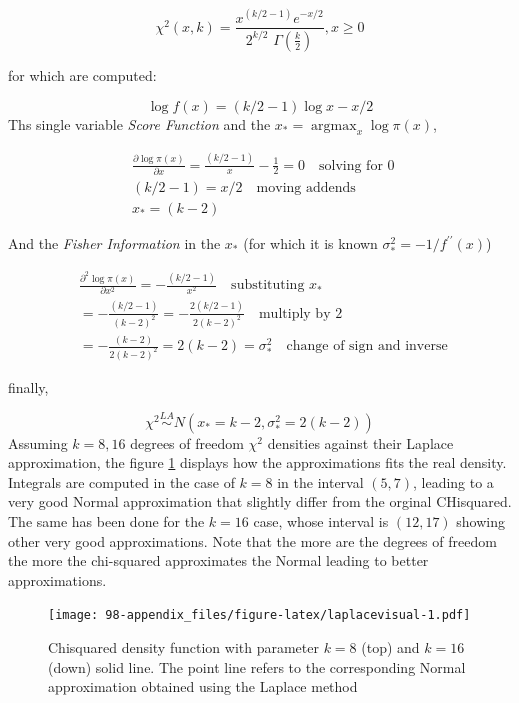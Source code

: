 \documentclass[
  12pt,
  a4paper,
  oneside]{book}
\theoremstyle{definition}
\theoremstyle{definition}
\theoremstyle{definition}
\theoremstyle{remark}
\begin{document}
\[
\chi^{2}(x,k)=\frac{x^{(k / 2-1)} e^{-x / 2}}{2^{k / 2} \,\, \Gamma\left(\frac{k}{2}\right)}, x \geq 0
\]

for which are computed:

\[
\log f(x)=(k / 2-1) \log x-x / 2
\]
Ths single variable \emph{Score Function} and the \(x_{*}=\operatorname{argmax}_{x} \log \pi(x)\),

\begin{equation}
\begin{aligned} 
  &\frac{\partial \log \pi(x)}{\partial x}= \frac{(k/2 -1)}{x} - \frac{1}{2} =0 \quad \text {solving for 0 }\\
  &(k/2-1) = x/2\quad \text {moving addends}\\
  &x_* = (k-2) 
\end{aligned}
\end{equation}

And the \emph{Fisher Information} in the \(x_*\) (for which it is known \(\sigma^{2}_*=-1 / f^{\prime \prime}(x)\))

\begin{equation} 
\begin{split}
  &\frac{\partial^2 \log \pi(x)}{\partial x^2}=-\frac{(k / 2-1) }{x^{2}} \quad \text {substituting} \,\,x_* \\
  &= -\frac{(k / 2-1) }{(k-2)^{2}} = - \frac{2(k/2-1)}{2(k-2)^{2}} \quad \text {multiply by 2 } \\
  &=-  \frac{(k-2)}{2(k-2)^{2}} = 2(k-2)  = \sigma^{2}_*\quad \text {change of sign and inverse }
\end{split}
\end{equation}

finally,

\[
\chi^{2} \stackrel{L A}{\sim} N\left(x_*=k-2, \sigma^{2}_*=2(k-2)\right)
\]
Assuming \(k = 8, 16\) degrees of freedom \(\chi^{2}\) densities against their Laplace approximation, the figure \ref{fig:laplacevisual} displays how the approximations fits the real density. Integrals are computed in the case of \(k = 8\) in the interval \((5, 7)\), leading to a very good Normal approximation that slightly differ from the orginal CHisquared. The same has been done for the \(k = 16\) case, whose interval is \((12, 17)\) showing other very good approximations. Note that the more are the degrees of freedom the more the chi-squared approximates the Normal leading to better approximations.

\begin{figure}
\centering
\texttt{[image: 98-appendix\_files/figure-latex/laplacevisual-1.pdf]}
\caption{\label{fig:laplacevisual}Chisquared density function with parameter \(k = 8\) (top) and \(k = 16\) (down) solid line. The point line refers to the corresponding Normal approximation obtained using the Laplace method}
\end{figure}

  
\end{document}
